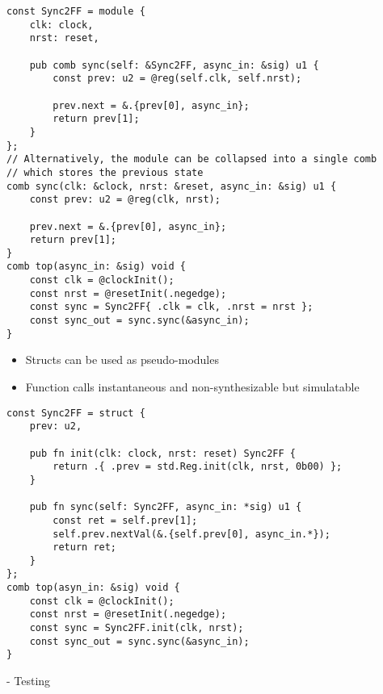 \documentclass[10pt]{article}
\begin{document}
\begin{verbatim}
const Sync2FF = module {
    clk: clock,
    nrst: reset,

    pub comb sync(self: &Sync2FF, async_in: &sig) u1 {
        const prev: u2 = @reg(self.clk, self.nrst);

        prev.next = &.{prev[0], async_in};
        return prev[1];
    }
};
// Alternatively, the module can be collapsed into a single comb
// which stores the previous state
comb sync(clk: &clock, nrst: &reset, async_in: &sig) u1 {
    const prev: u2 = @reg(clk, nrst);

    prev.next = &.{prev[0], async_in};
    return prev[1];
}
comb top(async_in: &sig) void {
    const clk = @clockInit();
    const nrst = @resetInit(.negedge);
    const sync = Sync2FF{ .clk = clk, .nrst = nrst };
    const sync_out = sync.sync(&async_in);
}
\end{verbatim}

\begin{itemize}
	\item Structs can be used as pseudo-modules
	\item Function calls instantaneous and non-synthesizable but simulatable
\end{itemize}

\begin{verbatim}
const Sync2FF = struct {
    prev: u2,

    pub fn init(clk: clock, nrst: reset) Sync2FF {
        return .{ .prev = std.Reg.init(clk, nrst, 0b00) };
    }

    pub fn sync(self: Sync2FF, async_in: *sig) u1 {
        const ret = self.prev[1];
        self.prev.nextVal(&.{self.prev[0], async_in.*});
        return ret;
    }
};
comb top(asyn_in: &sig) void {
    const clk = @clockInit();
    const nrst = @resetInit(.negedge);
    const sync = Sync2FF.init(clk, nrst);
    const sync_out = sync.sync(&async_in);
}
\end{verbatim}

- Testing
\end{document}
